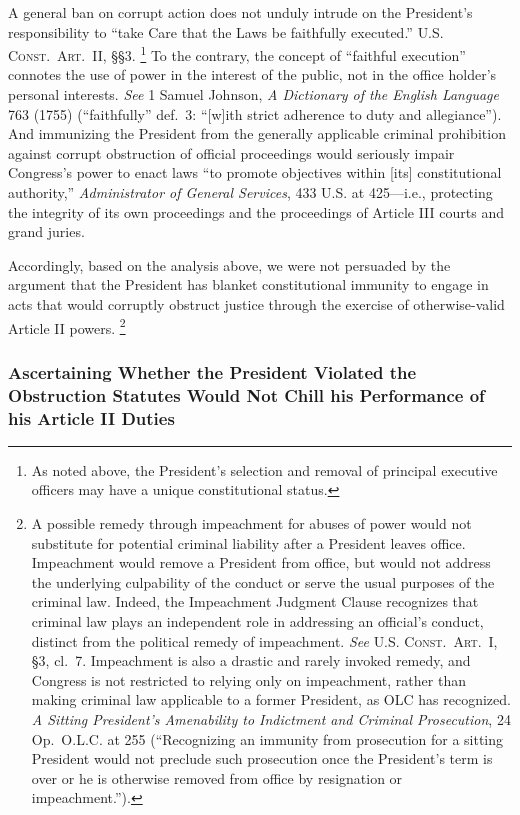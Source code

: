 A general ban on corrupt action does not unduly intrude on the President’s responsibility to “take Care that the Laws be faithfully executed.”
\textsc{U.S. Const.\ Art.~II}, \S\S 3.%
\footnote{As noted above, the President’s selection and removal of principal executive officers may have a unique constitutional status.}
To the contrary, the concept of “faithful execution” connotes the use of power in the interest of the public, not in the office holder’s personal interests.
\textit{See} 1 Samuel Johnson, \textit{A Dictionary of the English Language} 763 (1755) (“faithfully” def.~3: “[w]ith strict adherence to duty and allegiance”).
And immunizing the President from the generally applicable criminal prohibition against corrupt obstruction of official proceedings would seriously impair Congress’s power to enact laws “to promote objectives within [its] constitutional authority,” \textit{Administrator of General Services}, 433 U.S. at 425---i.e., protecting the integrity of its own proceedings and the proceedings of Article III courts and grand juries.

Accordingly, based on the analysis above, we were not persuaded by the argument that the President has blanket constitutional immunity to engage in acts that would corruptly obstruct justice through the exercise of otherwise-valid Article II powers.%
\footnote{A possible remedy through impeachment for abuses of power would not substitute for potential criminal liability after a President leaves office.
Impeachment would remove a President from office, but would not address the underlying culpability of the conduct or serve the usual purposes of the criminal law.
Indeed, the Impeachment Judgment Clause recognizes that criminal law plays an independent role in addressing an official’s conduct, distinct from the political remedy of impeachment.
\textit{See} \textsc{U.S. Const.\ Art}.~I, \S 3, cl.~7.
Impeachment is also a drastic and rarely invoked remedy, and Congress is not restricted to relying only on impeachment, rather than making criminal law applicable to a former President, as OLC has recognized.
\textit{A Sitting President's Amenability to Indictment and Criminal Prosecution}, 24 Op.\ O.L.C. at 255 (“Recognizing an immunity from prosecution for a sitting President would not preclude such prosecution once the President’s term is over or he is otherwise removed from office by resignation or impeachment.”).}

\subsubsection{Ascertaining Whether the President Violated the Obstruction Statutes Would Not Chill his Performance of his Article II Duties}

